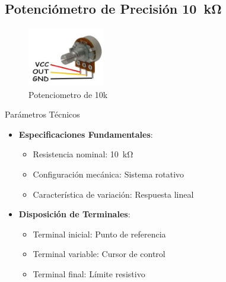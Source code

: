 \subsection{Potenciómetro de Precisión \SI{10}{\kilo\ohm}}
\begin{figure}[H]
	\centering
	\includegraphics[width=0.3\textwidth]{images/potenciometro}
	\caption{Potenciometro de 10k\ohm}
	\label{fig:potenciometro}
\end{figure}
\begin{componentBox}{Parámetros Técnicos \citep{horowitz2015art}}
	\begin{itemize}[leftmargin=*,itemsep=1pt,parsep=1pt]
		\item \textbf{Especificaciones Fundamentales}:
		\begin{itemize}[itemsep=0pt,parsep=0pt]
			\item Resistencia nominal: \SI{10}{\kilo\ohm}
			\item Configuración mecánica: Sistema rotativo
			\item Característica de variación: Respuesta lineal
		\end{itemize}
		\item \textbf{Disposición de Terminales}:
		\begin{itemize}[itemsep=0pt,parsep=0pt]
			\item Terminal inicial: Punto de referencia
			\item Terminal variable: Cursor de control
			\item Terminal final: Límite resistivo
		\end{itemize}
	\end{itemize}
\end{componentBox}

